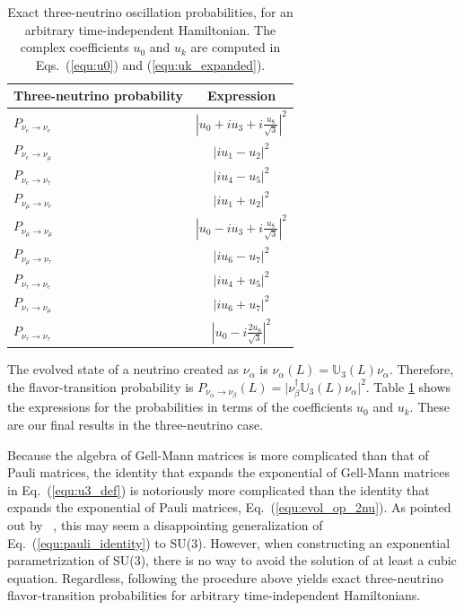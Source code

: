 \documentclass[final,5p,times,twocolumn]{elsarticle}
\newcommand{\eq}{Eq.}
\providecommand{\Ref}{} %
\newcommand{\equ}[1]{\eq~(\ref{equ:#1})}
\begin{document}
{\def\arraystretch{1.3}
\begin{table}[t!]
  \begin{tabular}{lc}
   Three-neutrino probability & Expression \\
   \hline 
   $P_{\nu_e \to \nu_e}$        & $\left\vert u_0 + i u_3 + i \frac{u_8}{\sqrt{3}} \right\vert^2$ \\
   $P_{\nu_e \to \nu_\mu}$      & $\left\vert i u_1 - u_2 \right\vert^2$ \\
   $P_{\nu_e \to \nu_\tau}$     & $\left\vert i u_4 - u_5 \right\vert^2$ \\
   $P_{\nu_\mu \to \nu_e}$      & $\left\vert i u_1 + u_2 \right\vert^2$ \\
   $P_{\nu_\mu \to \nu_\mu}$    & $\left\vert u_0 - i u_3 + i \frac{u_8}{\sqrt{3}} \right\vert^2$ \\
   $P_{\nu_\mu \to \nu_\tau}$   & $\left\vert i u_6 - u_7 \right\vert^2$ \\
   $P_{\nu_\tau \to \nu_e}$     & $\left\vert i u_4 + u_5 \right\vert^2$ \\
   $P_{\nu_\tau \to \nu_\mu}$   & $\left\vert i u_6 + u_7 \right\vert^2$ \\
   $P_{\nu_\tau \to \nu_\tau}$  & $\left\vert u_0 - i \frac{2 u_8}{\sqrt{3}} \right\vert^2$ \\
  \end{tabular}
  \caption{\label{tab:prob_3nu}Exact three-neutrino oscillation probabilities, for an arbitrary time-independent Hamiltonian.  The complex coefficients $u_0$ and $u_k$ are computed in Eqs.\ (\ref{equ:u0}) and (\ref{equ:uk_expanded}).}
\end{table}
}

The evolved state of a neutrino created as $\nu_\alpha$ is $\nu_\alpha(L) = \mathbb{U}_3(L) \nu_\alpha$.  Therefore, the flavor-transition probability is $P_{\nu_\alpha \to \nu_\beta}(L) = \lvert \nu_\beta^\dagger \mathbb{U}_3(L) \nu_\alpha \rvert^2$.   Table \ref{tab:prob_3nu} shows the expressions for the probabilities in terms of the coefficients $u_0$ and $u_k$.  These are our final results in the three-neutrino case.  

Because the algebra of Gell-Mann matrices is more complicated than that of Pauli matrices, the identity that expands the exponential of Gell-Mann matrices in \equ{u3_def} is notoriously more complicated than the identity that expands the exponential of Pauli matrices, \equ{evol_op_2nu}.  As pointed out by \Ref\ \cite{MacFarlane:1968vc}, this may seem a disappointing generalization of \equ{pauli_identity} to SU(3).  However, when constructing an exponential parametrization of SU(3), there is no way to avoid the solution of at least a cubic equation.  Regardless, following the procedure above yields exact three-neutrino flavor-transition probabilities for arbitrary time-independent Hamiltonians.
\end{document}
